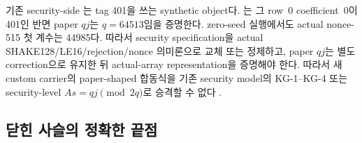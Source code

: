 \begin{openobligation}
기존 security-side 는
 tag 401을 쓰는 synthetic object다.
는 그 row~0 coefficient~0이
401인 반면 paper \(qj\)는 \(q=64513\)임을 증명한다. zero-seed 실행에서도
actual nonce-515 첫 계수는 44985다. 따라서 security specification을 actual
SHAKE128/LE16/rejection/nonce 의미론으로 교체 또는 정제하고, paper \(qj\)는
별도 correction으로 유지한 뒤 actual-array representation을 증명해야 한다.
따라서 새 custom carrier의 paper-shaped 합동식을 기존 security model의
KG-1--KG-4 또는 security-level \(A s=qj\pmod{2q}\)로 승격할 수 없다
\cite{post-freeze-kg-actual-avec-qj-report}.
\end{openobligation}

\subsection{닫힌 사슬의 정확한 끝점}

